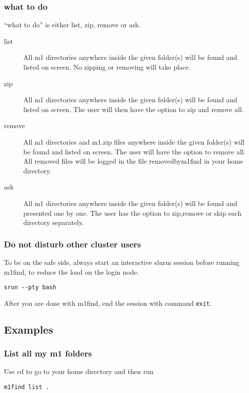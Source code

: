 \documentclass[a4wide,12pt]{article}
\renewcommand{\_}{\textscale{.7}{\textunderscore}}
\begin{document}
\subsubsection*{what to do}
``what to do'' is either list, zip, remove or ask.
\begin{description}
\item[list] All m1 directories anywhere inside the given folder(s) will be found and listed on screen.
         No zipping or removing will take place. 
\item[zip] All m1 directories anywhere inside the given folder(s) will be found and listed on screen.
         The user will then have the option to zip and remove all.
\item[remove] All m1 directories and m1.zip files anywhere inside the given folder(s) will be found and listed on screen.
         The user will have the option to remove all.
         All removed files will be logged in the file removed\_by\_m1find in your home directory.
\item[ask] All m1 directories anywhere inside the given folder(s) will be found and presented one by one.
         The user has the option to zip,remove or skip each directory separately.
\end{description}

\subsubsection*{Do not disturb other cluster users}
To be on the safe side, always
start an interactive slurm session before running m1find,
to reduce the load on the login node.
\begin{verbatim}
srun --pty bash
\end{verbatim}

\noindent After you are done with m1find, end the session with command \verb|exit|.

\subsection{Examples}

\subsubsection*{List all my m1 folders}
Use cd to go to your home directory and then run
\begin{verbatim}
m1find list .
\end{verbatim}
\end{document}
